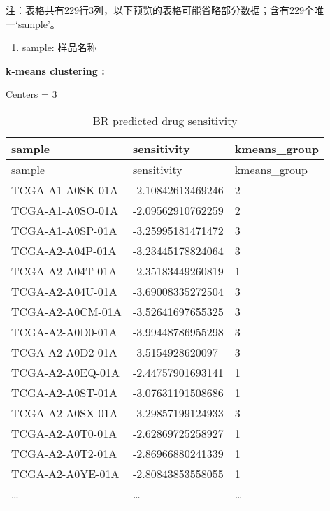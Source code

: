 \documentclass[
]{article}
\providecommand{\tightlist}{%
  \setlength{\itemsep}{0pt}\setlength{\parskip}{0pt}}
\begin{document}
\begin{center}\begin{tcolorbox}[colback=gray!10, colframe=gray!50, width=0.9\linewidth, arc=1mm, boxrule=0.5pt]注：表格共有229行3列，以下预览的表格可能省略部分数据；含有229个唯一`sample'。
\end{tcolorbox}
\end{center}
\begin{center}\begin{tcolorbox}[colback=gray!10, colframe=gray!50, width=0.9\linewidth, arc=1mm, boxrule=0.5pt]\begin{enumerate}\tightlist
\item sample:  样品名称
\end{enumerate}\end{tcolorbox}
\end{center}\begin{center}\begin{tcolorbox}[colback=gray!10, colframe=gray!50, width=0.9\linewidth, arc=1mm, boxrule=0.5pt]
\textbf{
k-means clustering
:}

\vspace{0.5em}

    Centers = 3

\vspace{2em}
\end{tcolorbox}
\end{center}

\begin{longtable}[]{@{}lll@{}}
\caption{\label{tab:BR-predicted-drug-sensitivity}BR predicted drug sensitivity}\tabularnewline
\toprule
sample & sensitivity & kmeans\_group\tabularnewline
\midrule
\endfirsthead
\toprule
sample & sensitivity & kmeans\_group\tabularnewline
\midrule
\endhead
TCGA-A1-A0SK-01A & -2.10842613469246 & 2\tabularnewline
TCGA-A1-A0SO-01A & -2.09562910762259 & 2\tabularnewline
TCGA-A1-A0SP-01A & -3.25995181471472 & 3\tabularnewline
TCGA-A2-A04P-01A & -3.23445178824064 & 3\tabularnewline
TCGA-A2-A04T-01A & -2.35183449260819 & 1\tabularnewline
TCGA-A2-A04U-01A & -3.69008335272504 & 3\tabularnewline
TCGA-A2-A0CM-01A & -3.52641697655325 & 3\tabularnewline
TCGA-A2-A0D0-01A & -3.99448786955298 & 3\tabularnewline
TCGA-A2-A0D2-01A & -3.5154928620097 & 3\tabularnewline
TCGA-A2-A0EQ-01A & -2.44757901693141 & 1\tabularnewline
TCGA-A2-A0ST-01A & -3.07631191508686 & 1\tabularnewline
TCGA-A2-A0SX-01A & -3.29857199124933 & 3\tabularnewline
TCGA-A2-A0T0-01A & -2.62869725258927 & 1\tabularnewline
TCGA-A2-A0T2-01A & -2.86966880241339 & 1\tabularnewline
TCGA-A2-A0YE-01A & -2.80843853558055 & 1\tabularnewline
\ldots{} & \ldots{} & \ldots{}\tabularnewline
\bottomrule
\end{longtable}
\end{document}
